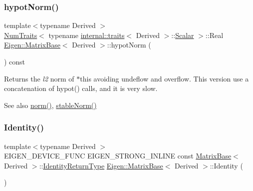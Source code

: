 \subsubsection{\texorpdfstring{hypotNorm()}{hypotNorm()}}
{\footnotesize\ttfamily template$<$typename Derived $>$ \\
\mbox{\hyperlink{struct_eigen_1_1_num_traits}{Num\+Traits}}$<$ typename \mbox{\hyperlink{struct_eigen_1_1internal_1_1traits}{internal\+::traits}}$<$ Derived $>$\+::\mbox{\hyperlink{class_eigen_1_1_dense_base_a5feed465b3a8e60c47e73ecce83e39a2}{Scalar}} $>$\+::Real \mbox{\hyperlink{class_eigen_1_1_matrix_base}{Eigen\+::\+Matrix\+Base}}$<$ Derived $>$\+::hypot\+Norm (\begin{DoxyParamCaption}{ }\end{DoxyParamCaption}) const\hspace{0.3cm}{\ttfamily [inline]}}

\begin{DoxyReturn}{Returns}
the {\itshape l2} norm of {\ttfamily $\ast$this} avoiding undeflow and overflow. This version use a concatenation of hypot() calls, and it is very slow.
\end{DoxyReturn}
\begin{DoxySeeAlso}{See also}
\mbox{\hyperlink{class_eigen_1_1_matrix_base_a5f6a3bc46add1f2e879ce15040e6987e}{norm()}}, \mbox{\hyperlink{class_eigen_1_1_matrix_base_ab84d3e64f855813b1eea4202c0697dc1}{stable\+Norm()}} 
\end{DoxySeeAlso}
\mbox{\label{class_eigen_1_1_matrix_base_a2ef43190f3aba0aef0cf1030d46d0ca7}} 
\subsubsection{\texorpdfstring{Identity()}{Identity()}\hspace{0.1cm}{\footnotesize\ttfamily [1/2]}}
{\footnotesize\ttfamily template$<$typename Derived $>$ \\
E\+I\+G\+E\+N\+\_\+\+D\+E\+V\+I\+C\+E\+\_\+\+F\+U\+NC E\+I\+G\+E\+N\+\_\+\+S\+T\+R\+O\+N\+G\+\_\+\+I\+N\+L\+I\+NE const \mbox{\hyperlink{class_eigen_1_1_matrix_base}{Matrix\+Base}}$<$ Derived $>$\+::\mbox{\hyperlink{class_eigen_1_1_cwise_nullary_op}{Identity\+Return\+Type}} \mbox{\hyperlink{class_eigen_1_1_matrix_base}{Eigen\+::\+Matrix\+Base}}$<$ Derived $>$\+::Identity (\begin{DoxyParamCaption}{ }\end{DoxyParamCaption})\hspace{0.3cm}{\ttfamily [static]}}

